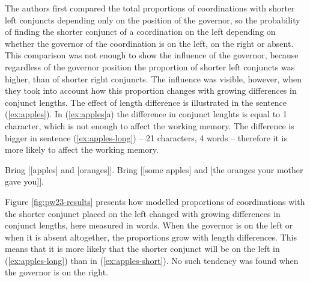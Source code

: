 The authors first compared the total proportions of coordinations with shorter left conjuncts depending only on the position of the governor, so the probability of finding the shorter conjunct of a coordination on the left depending on whether the governor of the coordination is on the left, on the right or absent. This comparison was not enough to show the influence of the governor, because regardless of the governor position the proportion of shorter left conjuncts was higher, than of shorter right conjuncts. The influence was visible, however, when they took into account how this proportion changes with growing differences in conjunct lengths. The effect of length difference is illustrated in the sentence (\ref{ex:apples}). In (\ref{ex:apples}a) the difference in conjunct lenghts is equal to 1 character, which is not enough to affect the working memory. The difference is bigger in sentence (\ref{ex:apples-long}) -- 21 characters, 4 words -- therefore it is more likely to affect the working memory.

\begin{exe}
    \ex\label{ex:apples}
    \begin{xlist}
    \ex\label{ex:apples-short}
    Bring $\Bigr[$[apples] and [oranges]$\Bigr]$.
    \ex\label{ex:apples-long}
    Bring $\Bigr[$[some apples] and [the oranges your mother gave you]$\Bigr]$.
    \end{xlist}
\end{exe}

Figure \ref{fig:pw23-results} presents how modelled proportions of coordinations with the shorter conjunct placed on the left changed with growing differences in conjunct lengths, here measured in words. When the governor is on the left or when it is absent altogether, the proportions grow with length differences. This means that it is more likely that the shorter conjunct will be on the left in (\ref{ex:apples-long}) than in (\ref{ex:apples-short}). No such tendency was found when the governor is on the right. 

